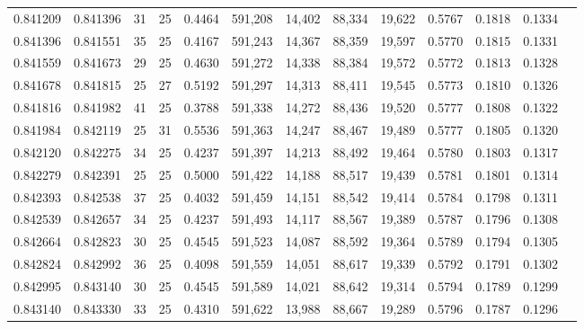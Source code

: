 \begin{tabular}{rrrrrrrrrrrrr}
0.841209 & 0.841396 &    31 &  25 &                                     0.4464 & 591,208 &  14,402 &  88,334 &  19,622 & 0.5767 & 0.1818 & 0.1334 \\
0.841396 & 0.841551 &    35 &  25 &                                     0.4167 & 591,243 &  14,367 &  88,359 &  19,597 & 0.5770 & 0.1815 & 0.1331 \\
0.841559 & 0.841673 &    29 &  25 &                                     0.4630 & 591,272 &  14,338 &  88,384 &  19,572 & 0.5772 & 0.1813 & 0.1328 \\
0.841678 & 0.841815 &    25 &  27 &                                     0.5192 & 591,297 &  14,313 &  88,411 &  19,545 & 0.5773 & 0.1810 & 0.1326 \\
0.841816 & 0.841982 &    41 &  25 &                                     0.3788 & 591,338 &  14,272 &  88,436 &  19,520 & 0.5777 & 0.1808 & 0.1322 \\
0.841984 & 0.842119 &    25 &  31 &                                     0.5536 & 591,363 &  14,247 &  88,467 &  19,489 & 0.5777 & 0.1805 & 0.1320 \\
0.842120 & 0.842275 &    34 &  25 &                                     0.4237 & 591,397 &  14,213 &  88,492 &  19,464 & 0.5780 & 0.1803 & 0.1317 \\
0.842279 & 0.842391 &    25 &  25 &                                     0.5000 & 591,422 &  14,188 &  88,517 &  19,439 & 0.5781 & 0.1801 & 0.1314 \\
0.842393 & 0.842538 &    37 &  25 &                                     0.4032 & 591,459 &  14,151 &  88,542 &  19,414 & 0.5784 & 0.1798 & 0.1311 \\
0.842539 & 0.842657 &    34 &  25 &                                     0.4237 & 591,493 &  14,117 &  88,567 &  19,389 & 0.5787 & 0.1796 & 0.1308 \\
0.842664 & 0.842823 &    30 &  25 &                                     0.4545 & 591,523 &  14,087 &  88,592 &  19,364 & 0.5789 & 0.1794 & 0.1305 \\
0.842824 & 0.842992 &    36 &  25 &                                     0.4098 & 591,559 &  14,051 &  88,617 &  19,339 & 0.5792 & 0.1791 & 0.1302 \\
0.842995 & 0.843140 &    30 &  25 &                                     0.4545 & 591,589 &  14,021 &  88,642 &  19,314 & 0.5794 & 0.1789 & 0.1299 \\
0.843140 & 0.843330 &    33 &  25 &                                     0.4310 & 591,622 &  13,988 &  88,667 &  19,289 & 0.5796 & 0.1787 & 0.1296 \\

\end{tabular}
